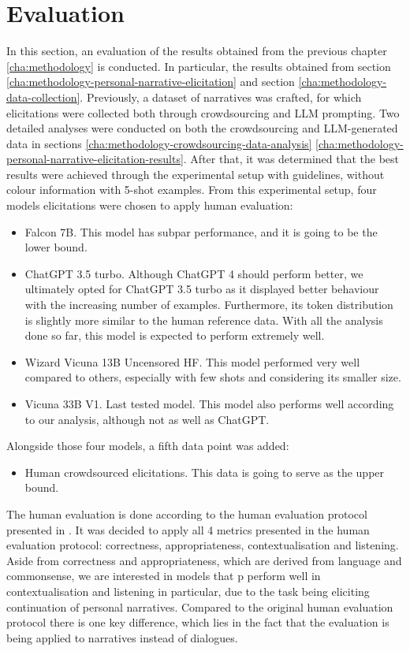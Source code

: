 \chapter{Evaluation}
\label{cha:evaluation}

In this section, an evaluation of the results obtained from the previous chapter \ref{cha:methodology} is conducted. In particular, the results obtained from section \ref{cha:methodology-personal-narrative-elicitation} and section \ref{cha:methodology-data-collection}. 
Previously, a dataset of narratives was crafted, for which elicitations were collected both through crowdsourcing and LLM prompting.
Two detailed analyses were conducted on both the crowdsourcing and LLM-generated data in sections \ref{cha:methodology-crowdsourcing-data-analysis} \ref{cha:methodology-personal-narrative-elicitation-results}. After that, it was determined that the best results were achieved through the experimental setup with guidelines, without colour information with 5-shot examples. 
From this experimental setup, four models elicitations were chosen to apply human evaluation:
\begin{itemize}
    \item Falcon 7B. This model has subpar performance, and it is going to be the lower bound.
    \item ChatGPT 3.5 turbo. Although ChatGPT 4 should perform better, we ultimately opted for ChatGPT 3.5 turbo as it displayed better behaviour with the increasing number of examples. Furthermore, its token distribution is slightly more similar to the human reference data. With all the analysis done so far, this model is expected to perform extremely well.
    \item Wizard Vicuna 13B Uncensored HF. This model performed very well compared to others, especially with few shots and considering its smaller size.
    \item Vicuna 33B V1. Last tested model. This model also performs well according to our analysis, although not as well as ChatGPT.
\end{itemize}
Alongside those four models, a fifth data point was added:
\begin{itemize}
    \item Human crowdsourced elicitations. This data is going to serve as the upper bound.
\end{itemize}
The human evaluation is done according to the human evaluation protocol presented in \cite{mousavi-etal-2022-evaluation}. It was decided to apply all 4 metrics presented in the human evaluation protocol: correctness, appropriateness, contextualisation and listening. Aside from correctness and appropriateness, which are derived from language and commonsense, we are interested in models that p
perform well in contextualisation and listening in particular, due to the task being eliciting continuation of personal narratives. Compared to the original human evaluation protocol there is one key difference, which lies in the fact that the evaluation is being applied to narratives instead of dialogues. 


